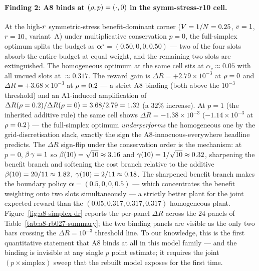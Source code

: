 \paragraph{Finding 2: A8 binds at $(\rho, p) = (\cdot, 0)$ in the
symm-stress-r10 cell.}
At the high-$r$ symmetric-stress benefit-dominant corner
($V = 1/N = 0.25$, $v = 1$, $r = 10$, variant~A) under
multiplicative conservation $p = 0$, the full-simplex optimum splits
the budget as $\boldsymbol{\alpha}^\star = (0.50, 0, 0, 0.50)$ — two
of the four slots absorb the entire budget at equal weight, and the
remaining two slots are extinguished. The homogeneous optimum at the
same cell sits at $\alpha_c \approx 0.05$ with all uncued slots at
$\approx 0.317$. The reward gain is $\Delta R = +2.79\!\times\!10^{-3}$
at $\rho = 0$ and $\Delta R = +3.68\!\times\!10^{-3}$ at
$\rho = 0.2$ — a strict A8 binding (both above the $10^{-3}$
threshold) and an A1-induced amplification of $\Delta R(\rho = 0.2) /
\Delta R(\rho = 0) = 3.68 / 2.79 = 1.32$ (a $32\%$ increase). At
$p = 1$ (the inherited additive rule) the same cell shows $\Delta R =
-1.38\!\times\!10^{-3}$ ($-1.14\!\times\!10^{-3}$ at $\rho = 0.2$) —
the full-simplex optimum \emph{underperforms} the homogeneous one by
the grid-discretisation slack, exactly the sign the
A8-innocuous-everywhere headline predicts. The $\Delta R$ sign-flip
under the conservation order is the mechanism: at $p = 0$,
$\beta\,\gamma = 1$ so $\beta(10) = \sqrt{10} \approx 3.16$ and
$\gamma(10) = 1/\sqrt{10} \approx 0.32$, sharpening the benefit branch
and softening the cost branch relative to the additive
$\beta(10) = 20/11 \approx 1.82$, $\gamma(10) = 2/11 \approx 0.18$.
The sharpened benefit branch makes the boundary policy
$\boldsymbol{\alpha} = (0.5, 0, 0, 0.5)$ — which concentrates the
benefit weighting onto two slots simultaneously — a strictly better
plant for the joint expected reward than the
$(0.05, 0.317, 0.317, 0.317)$ homogeneous plant.
Figure~\ref{fig:a8-simplex-dr} reports the per-panel $\Delta R$ across
the $24$ panels of Table~\ref{tab:a8-rb027-summary}; the two binding
panels are visible as the only two bars crossing the $\Delta R = 10^{-3}$
threshold line. To our knowledge, this is the first quantitative
statement that A8 binds at all in this model family — and the binding
is invisible at any single $p$ point estimate; it requires the joint
$(p \times \text{simplex})$ sweep that the rebuilt model exposes for
the first time.

